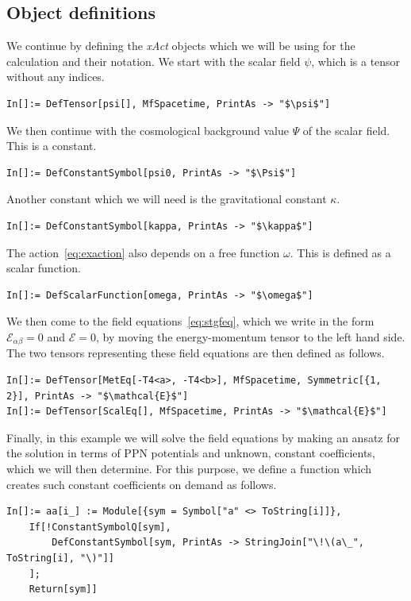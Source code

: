 \documentclass[notitlepage,a4paper,aps,prd,onecolumn,superscriptaddress,nofootinbib,groupedaddress,longbibliography]{revtex4-1}
\newcommand{\xAct}{\emph{xAct}}
\begin{document}
\subsection{Object definitions}\label{ssec:defi}
We continue by defining the \xAct{} objects which we will be using for the calculation and their notation. We start with the scalar field \(\psi\), which is a tensor without any indices.
\begin{lstlisting}
In[]:= DefTensor[psi[], MfSpacetime, PrintAs -> "$\psi$"]
\end{lstlisting}
We then continue with the cosmological background value \(\Psi\) of the scalar field. This is a constant.
\begin{lstlisting}
In[]:= DefConstantSymbol[psi0, PrintAs -> "$\Psi$"]
\end{lstlisting}
Another constant which we will need is the gravitational constant \(\kappa\).
\begin{lstlisting}
In[]:= DefConstantSymbol[kappa, PrintAs -> "$\kappa$"]
\end{lstlisting}
The action~\eqref{eq:exaction} also depends on a free function \(\omega\). This is defined as a scalar function.
\begin{lstlisting}
In[]:= DefScalarFunction[omega, PrintAs -> "$\omega$"]
\end{lstlisting}
We then come to the field equations~\eqref{eq:stgfeq}, which we write in the form \(\mathcal{E}_{\alpha\beta} = 0\) and \(\mathcal{E} = 0\), by moving the energy-momentum tensor to the left hand side. The two tensors representing these field equations are then defined as follows.
\begin{lstlisting}
In[]:= DefTensor[MetEq[-T4<a>, -T4<b>], MfSpacetime, Symmetric[{1, 2}], PrintAs -> "$\mathcal{E}$"]
In[]:= DefTensor[ScalEq[], MfSpacetime, PrintAs -> "$\mathcal{E}$"]
\end{lstlisting}
Finally, in this example we will solve the field equations by making an ansatz for the solution in terms of PPN potentials and unknown, constant coefficients, which we will then determine. For this purpose, we define a function which creates such constant coefficients on demand as follows.
\begin{lstlisting}
In[]:= aa[i_] := Module[{sym = Symbol["a" <> ToString[i]]},
	If[!ConstantSymbolQ[sym],
		DefConstantSymbol[sym, PrintAs -> StringJoin["\!\(a\_", ToString[i], "\)"]]
	];
	Return[sym]]
\end{lstlisting}
\end{document}
